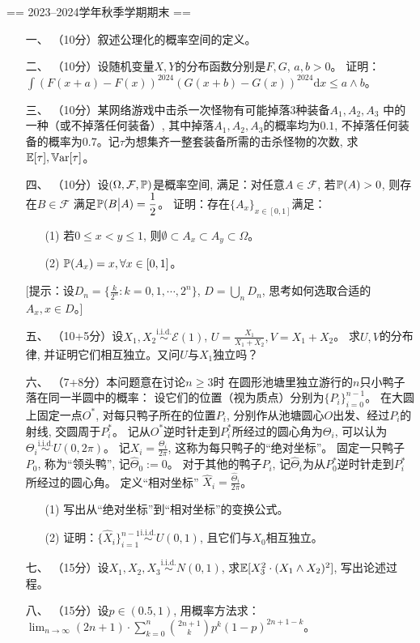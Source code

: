 == 2023--2024学年秋季学期期末 ==
\begin{itemize}
    \item [一、]（10分）叙述公理化的概率空间的定义。
    \item [二、]（10分）设随机变量$X,Y$的分布函数分别是$F,G$, $a,b > 0$。
    证明：$\displaystyle \int (F(x+a) - F(x))^{2024}(G(x+b) - G(x))^{2024} \mathrm{d} x \le a \wedge b$。
    \item [三、]（10分）某网络游戏中击杀一次怪物有可能掉落$3$种装备$A_1, A_2,A_3$
    中的一种（或不掉落任何装备）, 其中掉落$A_1,A_2,A_3$的概率均为$0.1$, 
    不掉落任何装备的概率为$0.7$。记$\tau$为想集齐一整套装备所需的击杀怪物的次数, 
    求$\mathbb{E}[\tau],\mathbb{V}\mathrm{ar}[\tau]$。
    \item [四、]（10分）设$(\Omega, \mathcal{F}, \mathbb{P})$是概率空间, 
    满足：对任意$A \in \mathcal{F}$, 若$\mathbb{P}(A)>0$, 则存在$B \in \mathcal{F}$
    满足$\displaystyle \mathbb{P}(B\big| A) = \frac{1}{2}$。
    证明：存在$\{A_x\}_{x \in [0,1]}$满足：
    \begin{enumerate}
        \item [(1)]若$0 \leqslant x < y \leqslant 1$, 
        则$\emptyset \subset A_x \subset A_y \subset \Omega$。
        \item [(2)]$\mathbb{P}(A_x) = x,\forall x \in [0,1]$。
    \end{enumerate}
    [提示：设$D_n = \big\{ \frac{k}{2^n} : k = 0,1,\cdots,2^n \big\}$, 
    $D = \bigcup\limits_n D_n$, 思考如何选取合适的$A_x,x\in D$。]
    \item [五、]（10+5分）设$X_1 ,X_2 \overset{\text{i.i.d.}}{\sim} \mathcal{E}(1)$, $\displaystyle U = \frac{X_1}{X_1 + X_2},V = X_1+X_2$。
    求$U,V$的分布律, 并证明它们相互独立。又问$U$与$X_1$独立吗？
    \item [六、]（7+8分）本问题意在讨论$n \geqslant 3$时
    在圆形池塘里独立游行的$n$只小鸭子落在同一半圆中的概率：
    设它们的位置（视为质点）分别为$\{P_i\}_{i = 0}^{n-1}$。
    在大圆上固定一点$O^*$, 对每只鸭子所在的位置$P_i$, 
    分别作从池塘圆心$O$出发、经过$P_i$的射线, 交圆周于$P_i^*$。
    记从$O^*$逆时针走到$P_i^*$所经过的圆心角为$\Theta_i$, 
    可以认为$\Theta_i \overset{\text{i.i.d.}}{\sim} U(0,2\pi)$。
    记$\displaystyle X_i = \frac{\Theta_i}{2\pi}$, 这称为每只鸭子的``绝对坐标''。
    固定一只鸭子$P_0$, 称为``领头鸭'', 记$\hat{\Theta}_0 := 0$。
    对于其他的鸭子$P_i$, 记$\hat{\Theta}_i$为从$P_0^*$逆时针走到$P_i^*$所经过的圆心角。
    定义``相对坐标'' $\displaystyle \hat{X}_i = \frac{\hat{\Theta}_i}{2\pi}$。
    \begin{enumerate}
        \item [(1)]写出从“绝对坐标”到“相对坐标”的变换公式。
        \item [(2)]证明：$\{\hat{X}_i\}_{i = 1}^{n-1} 
        \overset{\text{i.i.d.}}{\sim} U(0,1)$, 且它们与$X_0$相互独立。
    \end{enumerate}
    \item [七、]（15分）设$X_1,X_2,X_3 \overset{\text{i.i.d.}}{\sim} N(0,1)$, 
    求$\mathbb{E}[X_3^2\cdot(X_1 \wedge X_2)^2]$, 写出论述过程。
    \item [八、]（15分）设$p \in (0.5,1)$, 用概率方法求：
    $\displaystyle \lim_{n \to \infty} 
    (2n+1)\cdot \sum_{k = 0}^n \binom{2n+1}{k} p^k(1-p)^{2n+1-k}$。
\end{itemize}
